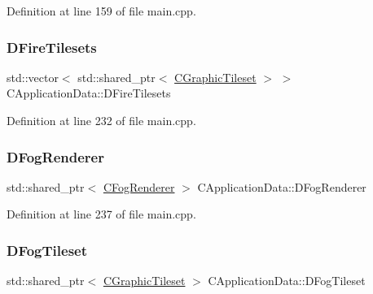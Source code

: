 Definition at line 159 of file main.\+cpp.

\hypertarget{classCApplicationData_a68f7be36ab8b46ea7fca3bd3e79784cd}{}\label{classCApplicationData_a68f7be36ab8b46ea7fca3bd3e79784cd} 
\subsubsection{\texorpdfstring{D\+Fire\+Tilesets}{DFireTilesets}}
{\footnotesize\ttfamily std\+::vector$<$ std\+::shared\+\_\+ptr$<$ \hyperlink{classCGraphicTileset}{C\+Graphic\+Tileset} $>$ $>$ C\+Application\+Data\+::\+D\+Fire\+Tilesets\hspace{0.3cm}{\ttfamily [protected]}}



Definition at line 232 of file main.\+cpp.

\hypertarget{classCApplicationData_ad825b9b196c31f92700541e1332009cc}{}\label{classCApplicationData_ad825b9b196c31f92700541e1332009cc} 
\subsubsection{\texorpdfstring{D\+Fog\+Renderer}{DFogRenderer}}
{\footnotesize\ttfamily std\+::shared\+\_\+ptr$<$ \hyperlink{classCFogRenderer}{C\+Fog\+Renderer} $>$ C\+Application\+Data\+::\+D\+Fog\+Renderer\hspace{0.3cm}{\ttfamily [protected]}}



Definition at line 237 of file main.\+cpp.

\hypertarget{classCApplicationData_a9d9103087da6592c08b8d6c669665323}{}\label{classCApplicationData_a9d9103087da6592c08b8d6c669665323} 
\subsubsection{\texorpdfstring{D\+Fog\+Tileset}{DFogTileset}}
{\footnotesize\ttfamily std\+::shared\+\_\+ptr$<$ \hyperlink{classCGraphicTileset}{C\+Graphic\+Tileset} $>$ C\+Application\+Data\+::\+D\+Fog\+Tileset\hspace{0.3cm}{\ttfamily [protected]}}



